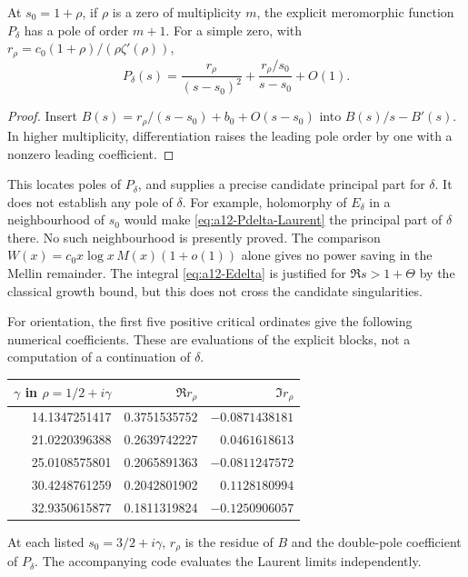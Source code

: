 \begin{proposition}
\label{prop:a12-Pdelta}
At $s_0=1+\rho$, if $\rho$ is a zero of multiplicity $m$, the explicit
meromorphic function $P_\delta$ has a pole of order $m+1$.
For a simple zero, with
$r_\rho=c_0(1+\rho)/(\rho\zeta'(\rho))$,
\begin{equation}
\label{eq:a12-Pdelta-Laurent}
P_\delta(s)=
\frac{r_\rho}{(s-s_0)^2}
+\frac{r_\rho/s_0}{s-s_0}+O(1).
\end{equation}
\end{proposition}
\begin{proof}
Insert $B(s)=r_\rho/(s-s_0)+b_0+O(s-s_0)$ into
$B(s)/s-B'(s)$. In higher multiplicity, differentiation raises the
leading pole order by one with a nonzero leading coefficient.
\end{proof}

This locates poles of $P_\delta$, and supplies a precise candidate
principal part for $\delta$. It does not establish any pole of $\delta$.
For example, holomorphy of $E_\delta$ in a neighbourhood of $s_0$ would
make \eqref{eq:a12-Pdelta-Laurent} the principal part of $\delta$ there.
No such neighbourhood is presently proved. The comparison
$W(x)=c_0x\log x\,M(x)(1+o(1))$ alone gives no power saving in the
Mellin remainder. The integral \eqref{eq:a12-Edelta} is justified for
$\Re s>1+\Theta$ by the classical growth bound, but this does not cross
the candidate singularities.

For orientation, the first five positive critical ordinates give the
following numerical coefficients. These are evaluations of the explicit
blocks, not a computation of a continuation of $\delta$.
\begin{center}
\small
\begin{tabular}{rrr}
\toprule
$\gamma$ in $\rho=1/2+i\gamma$&
$\Re r_\rho$&$\Im r_\rho$\\
\midrule
14.1347251417&0.3751535752&$-0.0871438181$\\
21.0220396388&0.2639742227&$ 0.0461618613$\\
25.0108575801&0.2065891363&$-0.0811247572$\\
30.4248761259&0.2042801902&$ 0.1128180994$\\
32.9350615877&0.1811319824&$-0.1250906057$\\
\bottomrule
\end{tabular}
\end{center}
At each listed $s_0=3/2+i\gamma$, $r_\rho$ is the residue of $B$ and the
double-pole coefficient of $P_\delta$.
The accompanying code evaluates the Laurent limits independently.

